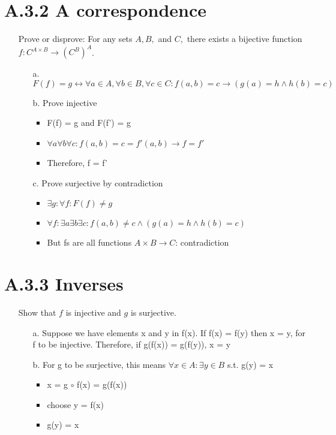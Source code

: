 \documentclass[12pt]{article}
\begin{document}
\section*{A.3.2 A correspondence}
\begin{enumerate}
  \item[]Prove or disprove: For any sets ${A,B,}$ and ${C,}$ there exists a bijective function ${f: C^{A\times B} \rightarrow (C^B)^A}$.
    \begin{enumerate}
      \item[a.] ${F(f) = g \leftrightarrow \forall a\in A, \forall b \in B, \forall c \in C : f(a,b) = c \rightarrow (g(a) = h \wedge h(b) = c)}$
      \item[b.] Prove injective
        \begin{itemize}
          \item F(f) = g and F(f') = g
          \item ${\forall a \forall b \forall c : f(a,b) = c = f'(a, b) \rightarrow f=f'}$
          \item Therefore, f = f'
        \end{itemize}
      \item[c.] Prove surjective by contradiction
        \begin{itemize}
          \item ${\exists g: \forall f : F(f) \neq g}$
          \item ${\forall f: \exists a \exists b \exists c : f(a,b) \neq c \wedge (g(a) = h \wedge h(b) = c)}$
          \item But fs are all functions ${A \times B \rightarrow C}$: contradiction
        \end{itemize}
    \end{enumerate}
\end{enumerate}

\section*{A.3.3 Inverses}
\begin{enumerate}
  \item[]Show that ${f}$ is injective and ${g}$ is surjective.
    \begin{enumerate}
      \item[a.] Suppose we have elements x and y in f(x). If f(x) = f(y) then x = y, for f to be injective. Therefore, if g(f(x)) = g(f(y)), x = y
      \item[b.] For g to be surjective, this means ${\forall x \in A :\exists y \in B}$ s.t. g(y) = x 
        \begin{itemize}
          \item x = g $\circ$ f(x) = g(f(x))
          \item choose y = f(x)
          \item g(y) = x
        \end{itemize}
    \end{enumerate}
\end{enumerate}
\end{document}
